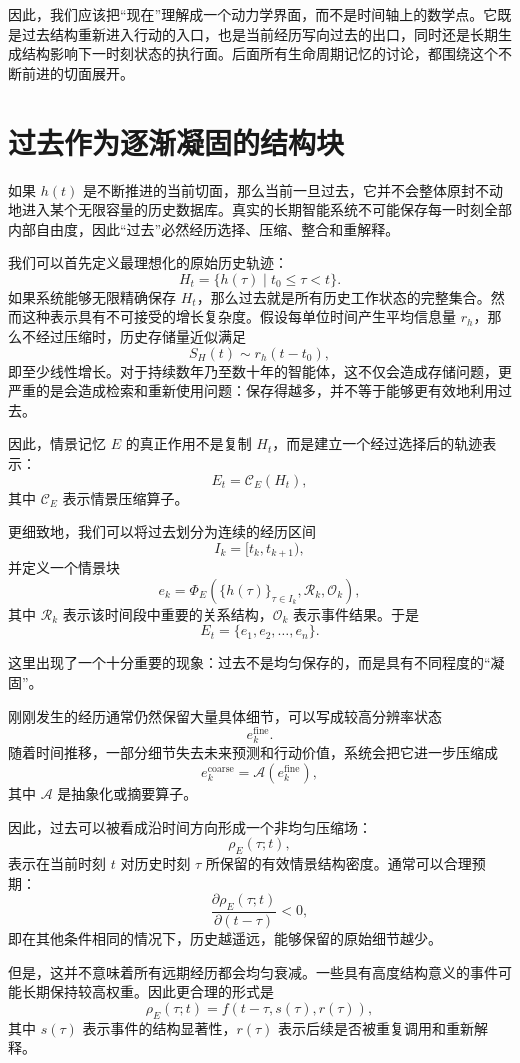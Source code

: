 因此，我们应该把“现在”理解成一个动力学界面，而不是时间轴上的数学点。它既是过去结构重新进入行动的入口，也是当前经历写向过去的出口，同时还是长期生成结构影响下一时刻状态的执行面。后面所有生命周期记忆的讨论，都围绕这个不断前进的切面展开。

\section{过去作为逐渐凝固的结构块}

如果 \(h(t)\) 是不断推进的当前切面，那么当前一旦过去，它并不会整体原封不动地进入某个无限容量的历史数据库。真实的长期智能系统不可能保存每一时刻全部内部自由度，因此“过去”必然经历选择、压缩、整合和重解释。

我们可以首先定义最理想化的原始历史轨迹：
\[
H_t
=
\{h(\tau)\mid t_0\leq\tau<t\}.
\]
如果系统能够无限精确保存 \(H_t\)，那么过去就是所有历史工作状态的完整集合。然而这种表示具有不可接受的增长复杂度。假设每单位时间产生平均信息量 \(r_h\)，那么不经过压缩时，历史存储量近似满足
\[
S_H(t)
\sim
r_h(t-t_0),
\]
即至少线性增长。对于持续数年乃至数十年的智能体，这不仅会造成存储问题，更严重的是会造成检索和重新使用问题：保存得越多，并不等于能够更有效地利用过去。

因此，情景记忆 \(E\) 的真正作用不是复制 \(H_t\)，而是建立一个经过选择后的轨迹表示：
\[
E_t
=
\mathcal C_E
\left(
H_t
\right),
\]
其中 \(\mathcal C_E\) 表示情景压缩算子。

更细致地，我们可以将过去划分为连续的经历区间
\[
I_k=[t_k,t_{k+1}),
\]
并定义一个情景块
\[
e_k
=
\Phi_E
\left(
\{h(\tau)\}_{\tau\in I_k},
\mathcal{R}_k,
\mathcal{O}_k
\right),
\]
其中 \(\mathcal{R}_k\) 表示该时间段中重要的关系结构，\(\mathcal{O}_k\) 表示事件结果。于是
\[
E_t
=
\{e_1,e_2,\ldots,e_n\}.
\]

这里出现了一个十分重要的现象：过去不是均匀保存的，而是具有不同程度的“凝固”。

刚刚发生的经历通常仍然保留大量具体细节，可以写成较高分辨率状态
\[
e_k^{\mathrm{fine}}.
\]
随着时间推移，一部分细节失去未来预测和行动价值，系统会把它进一步压缩成
\[
e_k^{\mathrm{coarse}}
=
\mathcal A(e_k^{\mathrm{fine}}),
\]
其中 \(\mathcal A\) 是抽象化或摘要算子。

因此，过去可以被看成沿时间方向形成一个非均匀压缩场：
\[
\rho_E(\tau;t),
\]
表示在当前时刻 \(t\) 对历史时刻 \(\tau\) 所保留的有效情景结构密度。通常可以合理预期：
\[
\frac{\partial\rho_E(\tau;t)}
{\partial(t-\tau)}
<0,
\]
即在其他条件相同的情况下，历史越遥远，能够保留的原始细节越少。

但是，这并不意味着所有远期经历都会均匀衰减。一些具有高度结构意义的事件可能长期保持较高权重。因此更合理的形式是
\[
\rho_E(\tau;t)
=
f
\left(
t-\tau,
s(\tau),
r(\tau)
\right),
\]
其中 \(s(\tau)\) 表示事件的结构显著性，\(r(\tau)\) 表示后续是否被重复调用和重新解释。

